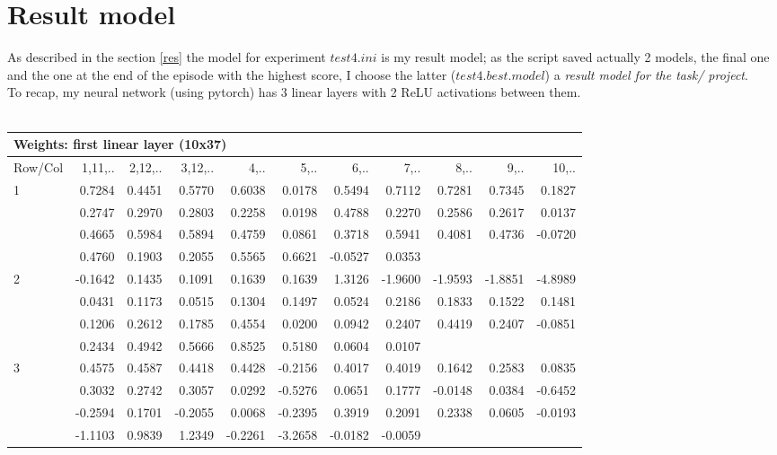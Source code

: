 \documentclass{article}
\begin{document}
\section{Result model}
As described in the section \ref{res} the model for experiment $test4.ini$ is
my result model; as the script saved actually 2 models, the final one and the
one at the end of the episode with the highest score, I choose the latter
($test4.best.model$) a \textit{result model for the task/ project}.
\\
To recap, my neural network (using pytorch) has 3 linear layers with 2 ReLU
activations between them.\\
\\
\tiny
\begin{tabular}{ |l|r|r|r|r|r|r|r|r|r|r| }
  \hline
\multicolumn{11}{|l|}{\textbf{Weights: first linear layer (10x37)}} \\
  \hline
Row/Col & 1,11,.. & 2,12,.. & 3,12,.. & 4,.. & 5,.. & 6,.. & 7,.. & 8,..& 9,..& 10,.. \\
  \hline
1 & 0.7284 & 0.4451 & 0.5770 & 0.6038 & 0.0178 & 0.5494 & 0.7112 & 0.7281 & 0.7345 & 0.1827 \\
  & 0.2747 & 0.2970 & 0.2803 & 0.2258 & 0.0198 & 0.4788 & 0.2270 & 0.2586 & 0.2617 & 0.0137 \\
  & 0.4665 & 0.5984 & 0.5894 & 0.4759 & 0.0861 & 0.3718 & 0.5941 & 0.4081 & 0.4736 &-0.0720 \\
  & 0.4760 & 0.1903 & 0.2055 & 0.5565 & 0.6621 & -0.0527 & 0.0353 & & & \\
2 & -0.1642 & 0.1435 & 0.1091 & 0.1639 & 0.1639 & 1.3126 & -1.9600 & -1.9593 &-1.8851 &-4.8989 \\
  & 0.0431 & 0.1173 & 0.0515 & 0.1304 & 0.1497 & 0.0524 & 0.2186 & 0.1833 & 0.1522 & 0.1481 \\
  & 0.1206 & 0.2612 & 0.1785 & 0.4554 & 0.0200 & 0.0942 & 0.2407 & 0.4419 & 0.2407 &-0.0851 \\
  & 0.2434 & 0.4942 & 0.5666 & 0.8525 & 0.5180 & 0.0604 & 0.0107 & & & \\
3 & 0.4575 & 0.4587 & 0.4418 & 0.4428 &-0.2156 & 0.4017 & 0.4019 & 0.1642 & 0.2583 & 0.0835 \\
  & 0.3032 & 0.2742 & 0.3057 & 0.0292 &-0.5276 & 0.0651 & 0.1777 &-0.0148 & 0.0384 &-0.6452 \\
  &-0.2594 & 0.1701 &-0.2055 & 0.0068 &-0.2395 & 0.3919 & 0.2091 & 0.2338 & 0.0605 &-0.0193 \\
  &-1.1103 & 0.9839 & 1.2349 &-0.2261 &-3.2658 &-0.0182 &-0.0059 & & & \\

\end{tabular}
\end{document}
